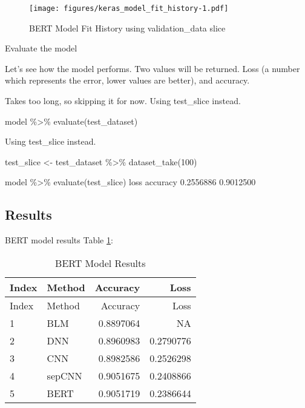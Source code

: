 \documentclass[
]{article}
\newenvironment{Shaded}{}{}
\newcommand{\DecValTok}[1]{\textcolor[rgb]{0.25,0.63,0.44}{#1}}
\newcommand{\FloatTok}[1]{\textcolor[rgb]{0.25,0.63,0.44}{#1}}
\newcommand{\FunctionTok}[1]{\textcolor[rgb]{0.02,0.16,0.49}{#1}}
\newcommand{\NormalTok}[1]{#1}
\newcommand{\OtherTok}[1]{\textcolor[rgb]{0.00,0.44,0.13}{#1}}
\newcommand{\SpecialCharTok}[1]{\textcolor[rgb]{0.25,0.44,0.63}{#1}}
\begin{document}
\begin{figure}
\centering
\texttt{[image: figures/keras\_model\_fit\_history-1.pdf]}
\caption{BERT Model Fit History using validation\_data
slice\label{fig:model_20}}
\end{figure}

Evaluate the model

Let's see how the model performs. Two values will be returned. Loss (a
number which represents the error, lower values are better), and
accuracy.

Takes too long, so skipping it for now. Using test\_slice instead.

\begin{Shaded}
\begin{Highlighting}[]
\NormalTok{model }\SpecialCharTok{\%\textgreater{}\%}
    \FunctionTok{evaluate}\NormalTok{(test\_dataset)}
\end{Highlighting}
\end{Shaded}

Using test\_slice instead.

\begin{Shaded}
\begin{Highlighting}[]
\NormalTok{test\_slice }\OtherTok{\textless{}{-}}\NormalTok{ test\_dataset }\SpecialCharTok{\%\textgreater{}\%}
    \FunctionTok{dataset\_take}\NormalTok{(}\DecValTok{100}\NormalTok{)}

\NormalTok{model }\SpecialCharTok{\%\textgreater{}\%}
    \FunctionTok{evaluate}\NormalTok{(test\_slice)}
\NormalTok{     loss  accuracy }
\FloatTok{0.2556886} \FloatTok{0.9012500} 
\end{Highlighting}
\end{Shaded}

\newpage

\hypertarget{results-4}{%
\subsection{Results}\label{results-4}}

BERT model results Table \ref{tbl:bert_results_table}:

\begin{longtable}[]{@{}llrr@{}}
\caption{BERT Model
Results\label{tbl:bert_results_table}}\tabularnewline
\toprule
Index & Method & Accuracy & Loss \\
\midrule
\endfirsthead
\toprule
Index & Method & Accuracy & Loss \\
\midrule
\endhead
1 & BLM & 0.8897064 & NA \\
2 & DNN & 0.8960983 & 0.2790776 \\
3 & CNN & 0.8982586 & 0.2526298 \\
4 & sepCNN & 0.9051675 & 0.2408866 \\
5 & BERT & 0.9051719 & 0.2386644 \\
\bottomrule
\end{longtable}
\end{document}
